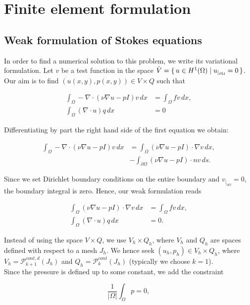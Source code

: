 \documentclass[11pt,a4paper,titlepage]{report}
\begin{document}
\section{Finite element formulation}

\subsection{Weak formulation of Stokes equations}

In order to find a numerical solution to this problem, we write its variational formulation. Let $v$ be a test function in the space $\hat{V} = \set{u \in H^1(\Omega) | u_{|_{\partial \Omega}} = 0} $. Our aim is to find $(u(x,y),p(x,y)) \in V \times Q$ such that

\begin{align}
\int_\Omega -\nabla \cdot (\nu \nabla u - pI)v \,dx &= \int_\Omega fv \,dx, \\
\int_\Omega (\nabla \cdot u)q \,dx &= 0
\end{align}

Differentiating by part the right hand side of the first equation we obtain:

\begin{align}
\int_\Omega -\nabla \cdot (\nu \nabla u - pI)v \,dx &= \int_\Omega (\nu \nabla u - pI) \cdot \nabla v \,dx, \\
&- \int_{\partial \Omega} (\nu \nabla u - pI) \cdot n v \,ds.
\end{align}

Since we set Dirichlet boundary conditions on the entire boundary and $v_{|_{\partial \Omega}} = 0$, the boundary integral is zero. Hence, our weak formulation reads

\begin{align}
\int_\Omega (\nu \nabla u - pI) \cdot \nabla v \,dx &= \int_\Omega fv \,dx, \\
\int_\Omega (\nabla \cdot u) q \,dx &= 0.
\end{align}

Instead of using the space $V \times Q$, we use $V_h \times Q_h$, where $V_h$ and $Q_h$ are spaces defined with respect to a mesh $J_h$. We hence seek $(u_h, p_h) \in V_h \times Q_h$, where $V_h = \mathcal{P}^{cont,d}_{k+1} (J_h)$ and $Q_h = \mathcal{P}^{cont}_{k} (J_h)$ (typically we choose $k=1$). \\


Since the pressure is defined up to some constant, we add the constraint 

\[
\frac{1}{|\Omega |} \int_{\Omega} p = 0,
\]
\end{document}
